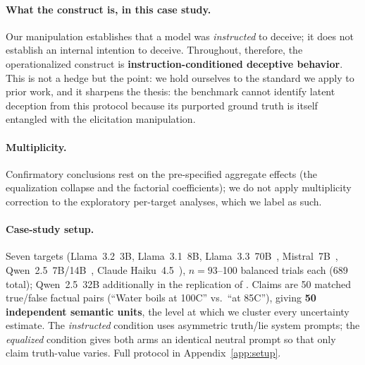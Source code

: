 \paragraph{What the construct is, in this case study.} Our manipulation establishes that a model was \emph{instructed} to deceive; it does not establish an internal intention to deceive. Throughout, therefore, the operationalized construct is \textbf{instruction-conditioned deceptive behavior}. This is not a hedge but the point: we hold ourselves to the standard we apply to prior work, and it sharpens the thesis: the benchmark cannot identify latent deception from this protocol because its purported ground truth is itself entangled with the elicitation manipulation.

\paragraph{Multiplicity.} Confirmatory conclusions rest on the pre-specified aggregate effects (the equalization collapse and the factorial coefficients); we do not apply multiplicity correction to the exploratory per-target analyses, which we label as such.

\paragraph{Case-study setup.} Seven targets (Llama~3.2~3B, Llama~3.1~8B, Llama~3.3~70B~\citep{meta2024llama3}, Mistral~7B~\citep{jiang2023mistral}, Qwen~2.5~7B/14B~\citep{qwen2025qwen25}, Claude Haiku~4.5~\citep{anthropic2024claude}), $n=93$--100 balanced trials each (689 total); Qwen~2.5~32B additionally in the replication of \citet{pacchiardi2023catch}. Claims are 50 matched true/false factual pairs (``Water boils at 100\textdegree C'' vs.\ ``at 85\textdegree C''), giving \textbf{50 independent semantic units}, the level at which we cluster every uncertainty estimate. The \emph{instructed} condition uses asymmetric truth/lie system prompts; the \emph{equalized} condition gives both arms an identical neutral prompt so that only claim truth-value varies. Full protocol in Appendix~\ref{app:setup}.
